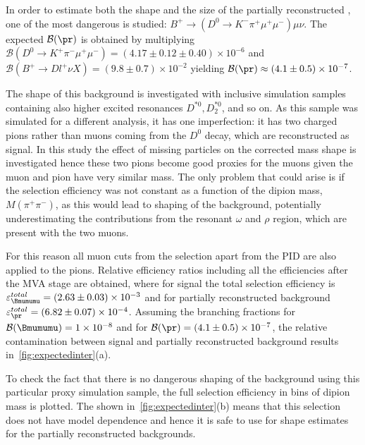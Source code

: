 In order to estimate both the shape and the size of the partially reconstructed \DIFdelbegin {}\DIFdelend \DIFaddbegin {}\DIFaddend , one of the most dangerous \DIFdelbegin {}\DIFdelend \DIFaddbegin {}\DIFaddend is studied: $B^+ \rightarrow (D^0 \rightarrow K^- \pi^+ \mu^{+} \mu^{-})\mu \nu$. The expected $\mathcal{B}(\pr)$ is obtained by multiplying $\mathcal{B}(D^{0} \rightarrow K^+ \pi^- \mu^+ \mu^{-}) = (4.17\pm0.12\pm0.40)\times 10^{-6}$\cite{Aaij:2015hva} and $\mathcal{B}(B^{+} \rightarrow D l^{+} \nu X) = (9.8 \pm 0.7)\times 10^{-2}$ \cite{Patrignani:2016xqp} yielding $\mathcal{B}(\pr) \approx (4.1\pm0.5)\times 10 ^{-7}$.

The shape of this background is investigated with inclusive simulation samples containing also higher excited resonances $D^{*0}, D_{2}^{*0}$, and so on. As this sample was simulated for a different analysis, it has one imperfection: it has two charged pions rather than muons coming from the $D^{0}$ decay, which are reconstructed as signal. In this study the effect of missing particles on the corrected mass shape is investigated hence these two pions become good proxies for the muons given the muon and pion have very similar mass. The only problem that could arise is if the selection efficiency was not constant as a function of the dipion mass, $M(\pi^{+}\pi^{-})$, as this would lead to shaping of the background, potentially underestimating the contributions from the resonant $\omega$ and $\rho$ region, which are present with the two muons. 

For this reason all muon cuts from the selection apart from the \gls{PID} are also applied to the pions. Relative efficiency ratios including all the efficiencies after the MVA stage are obtained, where for signal the total selection efficiency is $\varepsilon^{total}_{\Bmumumu}=(2.63 \pm 0.03)\times 10^{-3}$ and for \DIFaddbegin {}\DIFaddend partially reconstructed background $\varepsilon^{total}_{\pr}=(6.82 \pm 0.07)\times 10^{-4}$. Assuming the branching fractions for $\mathcal{B}(\Bmumumu) = 1\times10^{-8}$ and for $\mathcal{B}(\pr ) = (4.1\pm0.5)\times10^{-7}$, the relative contamination between signal and partially reconstructed background results in~\autoref{fig:expectedinter}(a). 

To check the fact that there is no dangerous shaping of the background using this particular proxy simulation sample, the full selection efficiency in bins of dipion mass is plotted. The \DIFdelbegin {}\DIFdelend \DIFaddbegin {}\DIFaddend shown in~\autoref{fig:expectedinter}(b) means that this selection does not have model dependence and hence it is safe to use for shape estimates for the partially reconstructed backgrounds.

